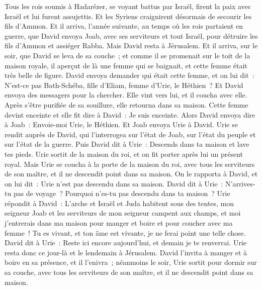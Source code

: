 \begin{multicols}{2}
Tous les rois soumis à Hadarézer, se voyant battus par Israël, firent la paix avec Israël et lui furent assujettis. Et les Syriens craignirent désormais de secourir les fils d'Ammon.
\VerseOne{}Et il arriva, l'année suivante, au temps où les rois partaient en guerre, que David envoya Joab, avec ses serviteurs et tout Israël, pour détruire les fils d'Ammon et assiéger Rabba. Mais David resta à Jérusalem.
Et il arriva, sur le soir, que David se leva de sa couche~; et comme il se promenait sur le toit de la maison royale, il aperçut de là une femme qui se baignait, et cette femme était très belle de figure.
David envoya demander qui était cette femme, et on lui dit~: N'est-ce pas Bath-Schéba, fille d'Eliam, femme d'Urie, le Héthien~?
Et David envoya des messagers pour la chercher. Elle vint vers lui, et il coucha avec elle. Après s'être purifiée de sa souillure, elle retourna dans sa maison.
Cette femme devint enceinte et elle fit dire à David~: Je suis enceinte.
Alors David envoya dire à Joab~: Envoie-moi Urie, le Héthien. Et Joab envoya Urie à David.
Urie se rendit auprès de David, qui l'interrogea sur l'état de Joab, sur l'état du peuple et sur l'état de la guerre.
Puis David dit à Urie~: Descends dans ta maison et lave tes pieds. Urie sortit de la maison du roi, et on fit porter après lui un présent royal.
Mais Urie se coucha à la porte de la maison du roi, avec tous les serviteurs de son maître, et il ne descendit point dans sa maison.
On le rapporta à David, et on lui dit~: Urie n'est pas descendu dans sa maison. David dit à Urie~: N'arrives-tu pas de voyage~? Pourquoi n'es-tu pas descendu dans ta maison~?
Urie répondit à David~: L'arche et Israël et Juda habitent sous des tentes, mon seigneur Joab et les serviteurs de mon seigneur campent aux champs, et moi j'entrerais dans ma maison pour manger et boire et pour coucher avec ma femme~! Tu es vivant, et ton âme est vivante, je ne ferai point une telle chose.
David dit à Urie~: Reste ici encore aujourd'hui, et demain je te renverrai. Urie resta donc ce jour-là et le lendemain à Jérusalem.
David l'invita à manger et à boire en sa présence, et il l'enivra~; néanmoins le soir, Urie sortit pour dormir sur sa couche, avec tous les serviteurs de son maître, et il ne descendit point dans sa maison.

\end{multicols}

